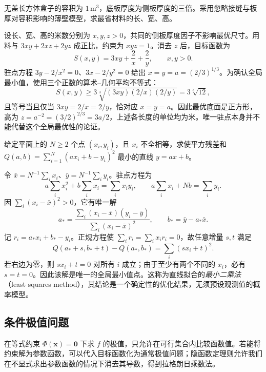 \begin{example}
\label{ex:open-box-material-minimum-ch14}
无盖长方体盒子的容积为 $1\,\mathrm m^3$，底板厚度为侧板厚度的三倍。采用忽略接缝与板厚对容积影响的薄壁模型，求最省材料的长、宽、高。
\end{example}
\begin{solve}
设长、宽、高的米数分别为 $x,y,z>0$，共同的侧板厚度因子不影响最优尺寸。用料与 $3xy+2xz+2yz$ 成正比，约束为 $xyz=1$。消去 $z$ 后，目标函数为
\[
    S(x,y)=3xy+\frac2x+\frac2y,\qquad x,y>0.
\]
驻点方程 $3y-2/x^2=0$、$3x-2/y^2=0$ 给出 $x=y=a=(2/3)^{1/3}$。为确认全局最小值，使用三个正数的算术--几何平均不等式：
\[
    S(x,y)\geq3\sqrt[3]{(3xy)(2/x)(2/y)}=3\sqrt[3]{12},
\]
且等号当且仅当 $3xy=2/x=2/y$，恰对应 $x=y=a$。因此最优底面是正方形，高为 $z=a^{-2}=(3/2)^{2/3}=3a/2$，上述各长度的单位均为米。唯一驻点本身并不能代替这个全局最优性的论证。
\end{solve}

\begin{example}
\label{ex:least-squares-line-ch14}
给定平面上的 $N\geq2$ 个点 $(x_i,y_i)$，且 $x_i$ 不全相等，求使平方残差和 $Q(a,b)=\sum_{i=1}^N(ax_i+b-y_i)^2$ 最小的直线 $y=ax+b$。
\end{example}
\begin{solve}
令 $\bar x=N^{-1}\sum_i x_i$、$\bar y=N^{-1}\sum_i y_i$。驻点方程为
\[
    a\sum_i x_i^2+b\sum_i x_i=\sum_i x_iy_i,\qquad
    a\sum_i x_i+Nb=\sum_i y_i.
\]
因 $\sum_i(x_i-\bar x)^2>0$，它有唯一解
\[
    a_* =\frac{\sum_i(x_i-\bar x)(y_i-\bar y)}{\sum_i(x_i-\bar x)^2},
    \qquad b_* =\bar y-a_*\bar x.
\]
记 $r_i=a_*x_i+b_*-y_i$。正规方程使 $\sum_i r_i=\sum_i x_ir_i=0$，故任意增量 $s,t$ 满足
\[
    Q(a_*+s,b_*+t)-Q(a_*,b_*)=\sum_i(sx_i+t)^2.
\]
若右边为零，则 $sx_i+t=0$ 对所有 $i$ 成立；由于至少有两个不同的 $x_i$，必有 $s=t=0$。因此该解是唯一的全局最小值点。这称为直线拟合的\emph{最小二乘法}（least squares method），其结论是一个确定性的优化结果，无须预设观测值的概率模型。
\end{solve}

\subsection{条件极值问题}
\label{subsec:constrained-extrema}

在等式约束 $\Phi(\boldsymbol x)=\boldsymbol0$ 下求 $f$ 的极值，只允许在可行集合内比较函数值。若能将约束解为参数函数，可以代入目标函数化为通常极值问题；隐函数定理则允许我们在不显式求出参数函数的情况下消去其导数，得到拉格朗日乘数法。

